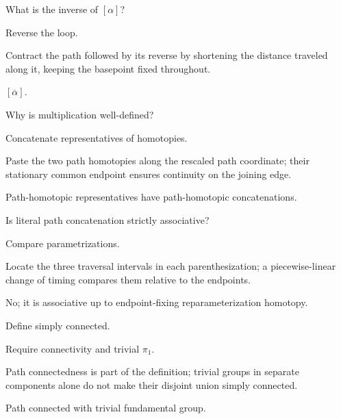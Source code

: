 \begin{exercise}\label{exr:viii09-09}
What is the inverse of \([\alpha]\)?
\end{exercise}
\begin{hint}
Reverse the loop.

Contract the path followed by its reverse by shortening the distance traveled along it, keeping the basepoint fixed throughout.
\end{hint}
\begin{solution}
\([\overline\alpha]\).
\end{solution}

\begin{exercise}\label{exr:viii09-10}
Why is multiplication well-defined?
\end{exercise}
\begin{hint}
Concatenate representatives of homotopies.

Paste the two path homotopies along the rescaled path coordinate; their stationary common endpoint ensures continuity on the joining edge.
\end{hint}
\begin{solution}
Path-homotopic representatives have path-homotopic concatenations.
\end{solution}

\begin{exercise}\label{exr:viii09-11}
Is literal path concatenation strictly associative?
\end{exercise}
\begin{hint}
Compare parametrizations.

Locate the three traversal intervals in each parenthesization; a piecewise-linear change of timing compares them relative to the endpoints.
\end{hint}
\begin{solution}
No; it is associative up to endpoint-fixing reparameterization homotopy.
\end{solution}

\begin{exercise}\label{exr:viii09-12}
Define simply connected.
\end{exercise}
\begin{hint}
Require connectivity and trivial \(\pi_1\).

Path connectedness is part of the definition; trivial groups in separate components alone do not make their disjoint union simply connected.
\end{hint}
\begin{solution}
Path connected with trivial fundamental group.
\end{solution}

